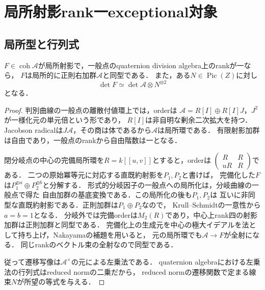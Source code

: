 \section{局所射影rank一exceptional対象}
\label{sec:exceptional-classification}

\subsection{局所型と行列式}

\begin{lemma}\label{lem:regular-rank-one}
$F\in\operatorname{coh}\mathcal A$が局所射影で，一般点のquaternion division algebra上のrankが一なら，
$F$は局所的に正則右加群$\mathcal A$と同型である．
また，ある$N\in\operatorname{Pic}(Z)$に対し
\[
 \det F\simeq\det\mathcal A\otimes N^{\otimes2}
\]
となる．
\end{lemma}
\begin{proof}
判別曲線の一般点の離散付値環上では，orderは
$\mathcal A=R[I]\oplus R[I]J$，$J^2$が一様化元の単元倍という形であり，
$R[I]$は非自明な剰余二次拡大を持つ．
Jacobson radicalは$J\mathcal A$，その商は体であるから$\mathcal A$は局所環である．
有限射影加群は自由であり，一般点のrankから自由階数は一となる．

閉分岐点の中心の完備局所環を$R=k[[u,v]]$とすると，orderは
$\left(\begin{smallmatrix}R&R\\uR&R\end{smallmatrix}\right)$である．
二つの原始冪等元に対応する直既約射影を$P_1,P_2$と書けば，
完備化した$F$は$P_1^{\oplus a}\oplus P_2^{\oplus b}$と分解する．
形式的分岐因子の一般点への局所化は，分岐曲線の一般点で得た
自由加群の基底変換である．この局所化の後も$P_1,P_2$は
互いに非同型な直既約射影である．正則加群は$P_1\oplus P_2$なので，
Krull--Schmidtの一意性から$a=b=1$となる．
分岐外では完備orderは$M_2(R)$であり，中心上rank四の射影加群は正則加群と同型である．
完備化上の生成元を中心の極大イデアルを法として持ち上げ，Nakayamaの補題を用いると，
元の局所環でも$\mathcal A\to F$が全射になる．
同じrankのベクトル束の全射なので同型である．

従って遷移写像は$\mathcal A^\times$の元による左乗法である．
quaternion algebraにおける左乗法の行列式はreduced normの二乗だから，
reduced normの遷移関数で定まる線束$N$が所望の等式を与える．
\end{proof}

